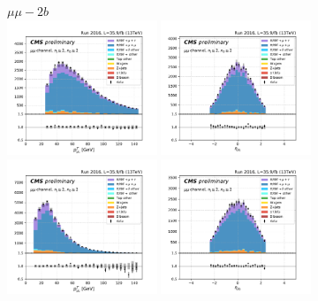 \begin{figure}[ht]
    \centering
    $\mu\mu - 2b$ \\
    \includegraphics[width=0.4\textwidth]{chapters/Analysis/sectionPlots/figures/kinematics_pickles/mumu/2b/mumu_2b_lepton1_pt.pdf}
    \includegraphics[width=0.4\textwidth]{chapters/Analysis/sectionPlots/figures/kinematics_pickles/mumu/2b/mumu_2b_lepton1_eta.pdf}
    \includegraphics[width=0.4\textwidth]{chapters/Analysis/sectionPlots/figures/kinematics_pickles/mumu/2b/mumu_2b_lepton2_pt.pdf}
    \includegraphics[width=0.4\textwidth]{chapters/Analysis/sectionPlots/figures/kinematics_pickles/mumu/2b/mumu_2b_lepton2_eta.pdf}

\end{figure}
